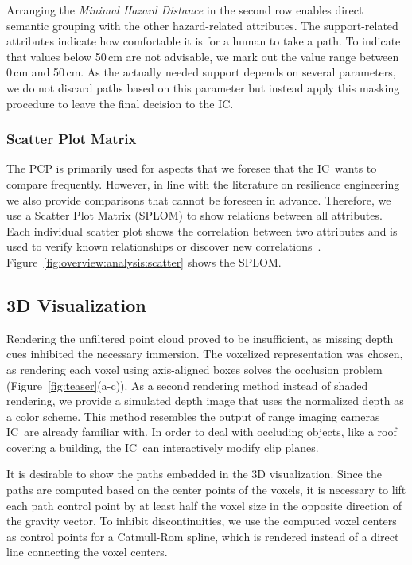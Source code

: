 \documentclass{egpubl}
\def\IC{IC}
\begin{document}
Arranging the \emph{Minimal Hazard Distance} in the second row enables direct semantic grouping with the other hazard-related attributes. The support-related attributes indicate how comfortable it is for a human to take a path. To indicate that values below 50\,cm are not advisable, we mark out the value range between 0\,cm and 50\,cm. As the actually needed support depends on several parameters, we do not discard paths based on this parameter but instead apply this masking procedure to leave the final decision to the \IC .

\subsubsection{Scatter Plot Matrix} \label{sec:overview:analysis:scatter}
The PCP is primarily used for aspects that we foresee that the \IC\ wants to compare frequently. However, in line with the literature on resilience engineering~\cite{Lundberg2012} we also provide comparisons that cannot be foreseen in advance. Therefore, we use a Scatter Plot Matrix (SPLOM) to show relations between all attributes. Each individual scatter plot shows the correlation between two attributes and is used to verify known relationships or discover new correlations~\cite{Li2008}. Figure~\ref{fig:overview:analysis:scatter} shows the SPLOM.

\subsection{3D Visualization} \label{sec:overview:3dvisualization}
 Rendering the unfiltered point cloud proved to be insufficient, as missing depth cues inhibited the necessary immersion. The voxelized representation was chosen, as rendering each voxel using axis-aligned boxes solves the occlusion problem (Figure~\ref{fig:teaser}(a-c)). As a second rendering method instead of shaded rendering, we provide a simulated depth image that uses the normalized depth as a color scheme. This method resembles the output of range imaging cameras \IC\ are already familiar with. In order to deal with occluding objects, like a roof covering a building, the \IC\ can interactively modify clip planes.

 It is desirable to show the paths embedded in the 3D visualization. Since the paths are computed based on the center points of the voxels, it is necessary to lift each path control point by at least half the voxel size in the opposite direction of the gravity vector. To inhibit discontinuities, we use the computed voxel centers as control points for a Catmull-Rom spline, which is rendered instead of a direct line connecting the voxel centers. 
\end{document}
